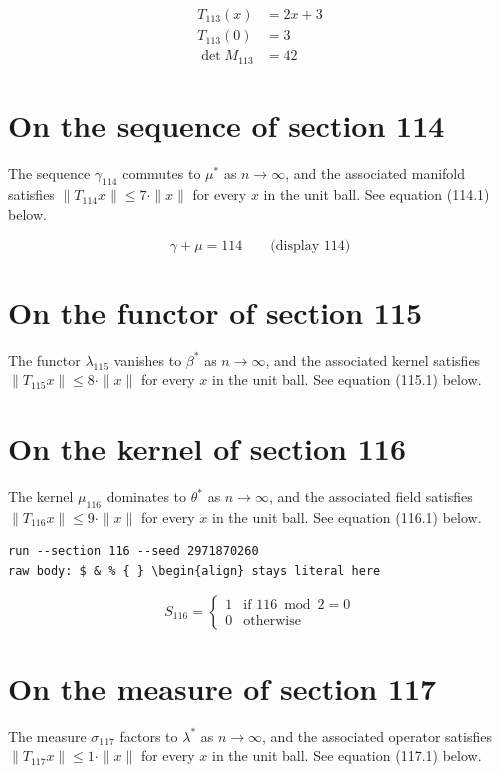\documentclass{article}
\begin{document}
\begin{align}
T_{113}(x) &= 2 x + 3 \\
T_{113}(0) &= 3 \\
\det M_{113} &= 42
\end{align}

\section{On the sequence of section 114}
The sequence $\gamma_{114}$ commutes to $\mu^{*}$ as $n \to \infty$,
and the associated manifold satisfies $\|T_{114} x\| \leq 7 \cdot \|x\|$
for every $x$ in the unit ball. See equation (114.1) below.

$$
\gamma + \mu = 114 \qquad \text{(display 114)}
$$

\section{On the functor of section 115}
The functor $\lambda_{115}$ vanishes to $\beta^{*}$ as $n \to \infty$,
and the associated kernel satisfies $\|T_{115} x\| \leq 8 \cdot \|x\|$
for every $x$ in the unit ball. See equation (115.1) below.

\section{On the kernel of section 116}
The kernel $\mu_{116}$ dominates to $\theta^{*}$ as $n \to \infty$,
and the associated field satisfies $\|T_{116} x\| \leq 9 \cdot \|x\|$
for every $x$ in the unit ball. See equation (116.1) below.

\begin{verbatim}
run --section 116 --seed 2971870260
raw body: $ & % { } \begin{align} stays literal here
\end{verbatim}

\begin{equation}
S_{116} = \begin{cases} 1 & \text{if } 116 \bmod 2 = 0 \\ 0 & \text{otherwise} \end{cases}
\end{equation}

\section{On the measure of section 117}
The measure $\sigma_{117}$ factors to $\lambda^{*}$ as $n \to \infty$,
and the associated operator satisfies $\|T_{117} x\| \leq 1 \cdot \|x\|$
for every $x$ in the unit ball. See equation (117.1) below.
\end{document}
